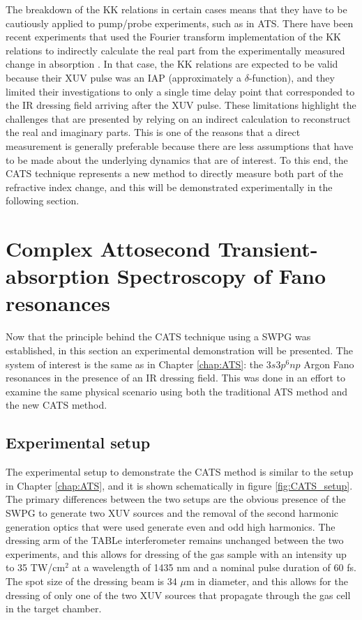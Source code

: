 The breakdown of the KK relations in certain cases means that they have to be cautiously applied to pump/probe experiments, such as in ATS.  There have been recent experiments that used the Fourier transform implementation of the KK relations \cite{petersonCausalityCalculationsTime1973} to indirectly calculate the real part from the experimentally measured change in absorption \cite{stoossRealTimeReconstructionStrongFieldDriven2018}.  In that case, the KK relations are expected to be valid because their XUV pulse was an IAP (approximately a $\delta$-function), and they limited their investigations to only a single time delay point that corresponded to the IR dressing field arriving after the XUV pulse.  These limitations highlight the challenges that are presented by relying on an indirect calculation to reconstruct the real and imaginary parts.  This is one of the reasons that a direct measurement is generally preferable because there are less assumptions that have to be made about the underlying dynamics that are of interest.  To this end, the CATS technique represents a new method to directly measure both part of the refractive index change, and this will be demonstrated experimentally in the following section.




\section{Complex Attosecond Transient-absorption Spectroscopy of Fano resonances}
\label{sec:CATS_ar}

Now that the principle behind the CATS technique using a SWPG was established, in this section an experimental demonstration will be presented.  The system of interest is the same as in Chapter \ref{chap:ATS}: the $3s3p^6np$ Argon Fano resonances in the presence of an IR dressing field. This was done in an effort to examine the same physical scenario using both the traditional ATS method and the new CATS method.

\subsection{Experimental setup}
\label{sec:CATS_ar_exp_setup}

The experimental setup to demonstrate the CATS method is similar to the setup in Chapter \ref{chap:ATS}, and it is shown schematically in figure \ref{fig:CATS_setup}.  The primary differences between the two setups are the obvious presence of the SWPG to generate two XUV sources and the removal of the second harmonic generation optics that were used generate even and odd  high harmonics.  The dressing arm of the TABLe interferometer remains unchanged between the two experiments, and this allows for dressing of the gas sample with an intensity up to 35 TW/cm$^2$ at a wavelength of 1435 nm and a nominal pulse duration of 60 fs. The spot size of the dressing beam is 34 $\mu$m in diameter, and this allows for the dressing of only one of the two XUV sources that propagate through the gas cell in the target chamber.

